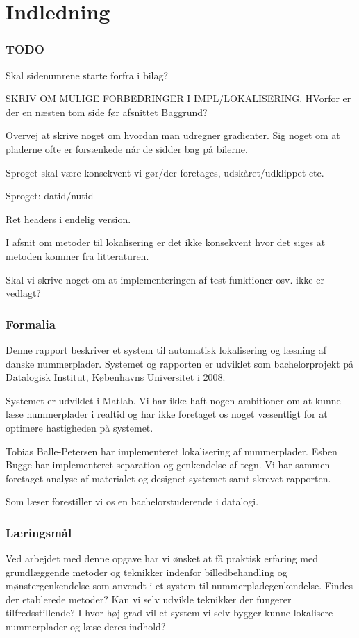 \section{Indledning}

\subsubsection*{TODO}
Skal sidenumrene starte forfra i bilag?

SKRIV OM MULIGE FORBEDRINGER I IMPL/LOKALISERING.
HVorfor er der en næsten tom side før afsnittet Baggrund?

Overvej at skrive noget om hvordan man udregner gradienter.
Sig noget om at pladerne ofte er forsænkede når de sidder bag på bilerne.

Sproget skal være konsekvent vi gør/der foretages, udskåret/udklippet etc.

Sproget: datid/nutid

Ret headers i endelig version.

I afsnit om metoder til lokalisering er det ikke konsekvent hvor det siges at metoden kommer fra litteraturen.

Skal vi skrive noget om at implementeringen af test-funktioner osv. ikke er vedlagt?

\subsubsection*{Formalia}
Denne rapport beskriver et system til automatisk lokalisering og læsning af danske nummerplader. Systemet og rapporten er udviklet som bachelorprojekt på Datalogisk Institut, Københavns Universitet i 2008.

Systemet er udviklet i Matlab. Vi har ikke haft nogen ambitioner om at kunne læse nummerplader i realtid og har ikke foretaget os noget væsentligt for at optimere hastigheden på systemet.

Tobias Balle-Petersen har implementeret lokalisering af nummerplader. Esben Bugge har implementeret separation og genkendelse af tegn. Vi har sammen foretaget analyse af materialet og designet systemet samt skrevet rapporten.

Som læser forestiller vi os en bachelorstuderende i datalogi.

\subsubsection*{Læringsmål}
Ved arbejdet med denne opgave har vi ønsket at få praktisk erfaring med grundlæggende metoder og teknikker indenfor billedbehandling og mønstergenkendelse som anvendt i et system til nummerpladegenkendelse. Findes der etablerede metoder? Kan vi selv udvikle teknikker der fungerer tilfredsstillende? I hvor høj grad vil et system vi selv bygger kunne lokalisere nummerplader og læse deres indhold?

